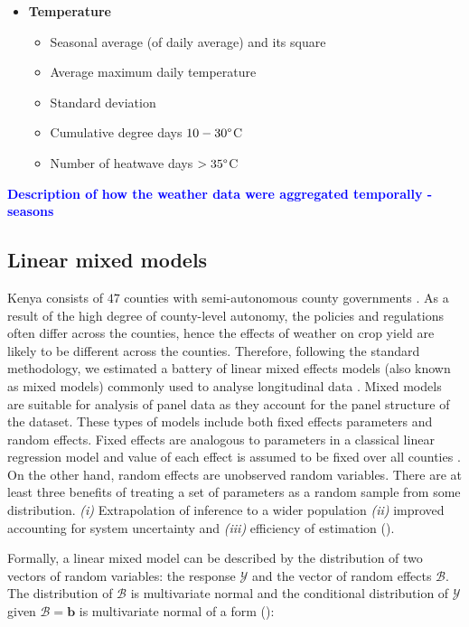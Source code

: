 \documentclass[a4paper,12pt]{article}
\begin{document}
\begin{itemize}
\begin{itemize}
\end{itemize}

\item \textbf{Temperature}
\begin{itemize}
\item Seasonal average (of daily average) and its square
\item Average maximum daily temperature
\item Standard deviation
\item Cumulative degree days $10-30\degree$C
\item Number of heatwave days $>35\degree$C
\end{itemize}
\end{itemize}
\textcolor{blue}{\textbf{Description of how the weather data were aggregated temporally - seasons}}

\subsection{Linear mixed models}
\sloppy
Kenya consists of $47$ counties with semi-autonomous county governments  \citep{Barasa2017}. As a result of the high degree of county-level autonomy, the policies and regulations often differ across the counties, hence the effects of weather on crop yield are likely to be different across the counties. Therefore, following the standard methodology, we estimated a battery of linear mixed effects models (also known as mixed models) commonly used to analyse longitudinal data \citep{bates2000mixed}. Mixed models are suitable for analysis of panel data as they account for the panel structure of the dataset. These types of models include both fixed effects parameters and random effects. Fixed effects are analogous to parameters in a classical linear regression model and value of each effect is assumed to be fixed over all counties \citep{bates2010lme4}. On the other hand, random effects are unobserved random variables. There are at least three benefits of treating a set of parameters as a random sample from some distribution. \textit{(i)} Extrapolation of inference to a wider population \textit{(ii)} improved accounting for system uncertainty and \textit{(iii)} efficiency of estimation (\citealp{KERYch9, KERYch12}).

Formally, a linear mixed model can be described by the distribution of two vectors of random variables: the response $\mathscr{Y}$ and the vector of random effects $\mathscr{B}$. The distribution of $\mathscr{B}$ is multivariate normal and the conditional distribution of $\mathscr{Y}$ given $\mathscr{B}=\mathbf{b}$ is multivariate normal of a form (\citealp{bates2010lme4, KERYch9}):
\end{document}
